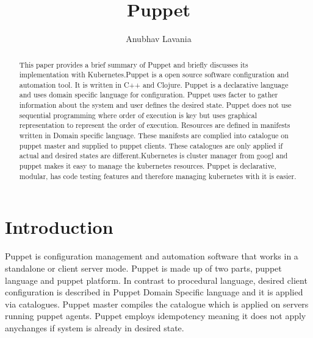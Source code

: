 
\title{Puppet}


\author{Anubhav Lavania}


\renewcommand{\shortauthors}{G. v. Laszewski}


\begin{abstract}
  This paper provides a brief summary of Puppet and briefly discusses its
  implementation with Kubernetes.Puppet is a open source software configuration
  and automation tool. It is written in C++ and Clojure. Puppet is a declarative
  language and uses domain specific language for configuration. Puppet uses
  facter to gather information about the system and user defines the desired
  state. Puppet does not use sequential programming where order of execution is
  key but uses graphical representation to represent the order of
  execution. Resources are defined in manifests written in Domain specific
  language. These manifests are complied into catalogue on puppet master and
  supplied to puppet clients. These catalogues are only applied if actual and
  desired states are different.Kubernetes is cluster manager from googl and
  puppet makes it easy to manage the kubernetes resources. Puppet is
  declarative, modular, has code testing features and therefore managing
  kubernetes with it is easier.
\end{abstract}



\maketitle



\section{Introduction}

Puppet is configuration management and automation software that works in a
standalone or client server mode. Puppet is made up of two parts, puppet
language and puppet platform. In contrast to procedural language, desired client
configuration is described in Puppet Domain Specific language and it is applied
via catalogues. Puppet master compiles the catalogue which is applied on servers
running puppet agents. Puppet employs idempotency meaning it does not apply anychanges if system is already in desired state.

